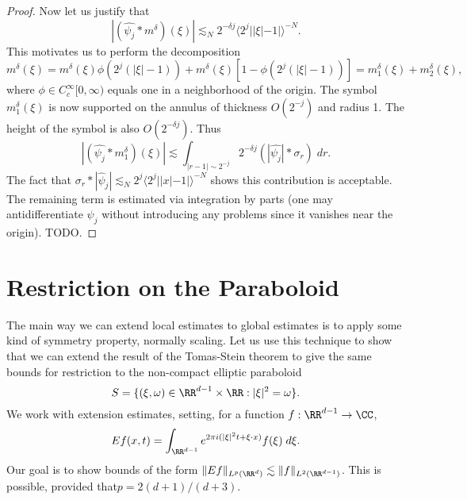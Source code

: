 \begin{proof}
    Now let us justify that
    \[ |(\widehat{\psi_j} * m^\delta)(\xi)| \lesssim_N 2^{-\delta j} \langle 2^j ||\xi| - 1| \rangle^{-N}. \]
    This motivates us to perform the decomposition
    \[ m^\delta(\xi) = m^\delta(\xi) \phi(2^j(|\xi| - 1)) + m^\delta(\xi) [1 - \phi(2^j(|\xi| - 1))] = m^\delta_1(\xi) + m^\delta_2(\xi), \]
    where $\phi \in C_c^\infty[0,\infty)$ equals one in a neighborhood of the origin. The symbol $m^\delta_1(\xi)$ is now supported on the annulus of thickness $O(2^{-j})$ and radius 1. The height of the symbol is also $O(2^{- \delta j})$. Thus
    \[ |(\widehat{\psi_j} * m^\delta_1)(\xi)| \lesssim \int_{| r - 1| \sim 2^{-j}} 2^{- \delta j} (|\widehat{\psi_j}| * \sigma_r)\; dr. \]
    The fact that $\sigma_r * |\widehat{\psi}_j| \lesssim_N 2^j \langle 2^j ||x| - 1| \rangle^{-N}$ shows this contribution is acceptable. The remaining term is estimated via integration by parts (one may antidifferentiate $\psi_j$ without introducing any problems since it vanishes near the origin). TODO.
\end{proof}

\section{Restriction on the Paraboloid}

The main way we can extend local estimates to global estimates is to apply some kind of symmetry property, normally scaling. Let us use this technique to show that we can extend the result of the Tomas-Stein theorem to give the same bounds for restriction to the non-compact elliptic paraboloid
%
\[ S = \{ (\xi,\omega) \in \RR^{d-1} \times \RR: |\xi|^2 = \omega \}. \]
%
We work with extension estimates, setting, for a function $f: \RR^{d-1} \to \CC$,
%
\[ Ef(x,t) = \int_{\RR^{d-1}} e^{2 \pi i (|\xi|^2 t + \xi \cdot x)} f(\xi)\; d\xi. \]
%
Our goal is to show bounds of the form $\| Ef \|_{L^p(\RR^d)} \lesssim \| f \|_{L^2(\RR^{d-1})}$. This is possible, provided that$p = 2(d+1)/(d+3)$.

